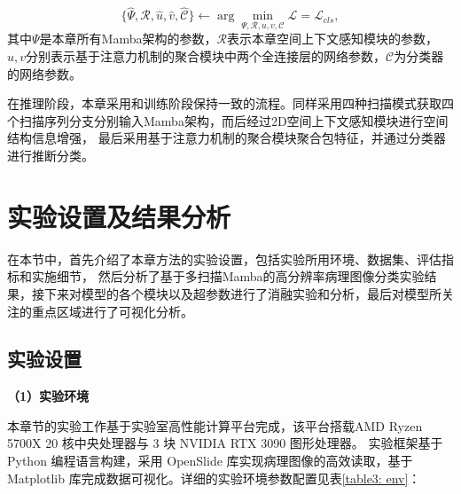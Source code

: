 \begin{equation}
\{\hat{\Psi},\hat{\mathcal{R}},\hat{u},\hat{v},\hat{\mathcal{C}}\} \gets\arg{ \min_{\Psi,\mathcal{R},u,v,\mathcal{C}}{\mathcal{L}}}=\mathcal{L}_{cls},
\end{equation}
其中$\Psi$是本章所有Mamba架构的参数，$\mathcal{R}$表示本章空间上下文感知模块的参数，$u,v$分别表示基于注意力机制的聚合模块中两个全连接层的网络参数，$\mathcal{C}$为分类器的网络参数。

在推理阶段，本章采用和训练阶段保持一致的流程。同样采用四种扫描模式获取四个扫描序列分支分别输入Mamba架构，而后经过2D空间上下文感知模块进行空间结构信息增强，
最后采用基于注意力机制的聚合模块聚合包特征，并通过分类器进行推断分类。


\section[\hspace{-2pt}实验设置及结果分析]{{\heiti{} \hspace{-8pt}实验设置及结果分析}}\label{section3: 实验设置及结果分析}

在本节中，首先介绍了本章方法的实验设置，包括实验所用环境、数据集、评估指标和实施细节，
然后分析了基于多扫描Mamba的高分辨率病理图像分类实验结果，接下来对模型的各个模块以及超参数进行了消融实验和分析，最后对模型所关注的重点区域进行了可视化分析。

\subsection[\hspace{-2pt}实验设置]{{\heiti{} \hspace{-8pt}实验设置}}\label{section3: 实验设置}

\textbf{（1）实验环境}

本章节的实验工作基于实验室高性能计算平台完成，该平台搭载AMD Ryzen 5700X 20 核中央处理器与 3 块 NVIDIA RTX 3090 图形处理器。
实验框架基于 Python 编程语言构建，采用 OpenSlide 库实现病理图像的高效读取，基于 Matplotlib 库完成数据可视化。详细的实验环境参数配置见表\ref{table3: env}：

